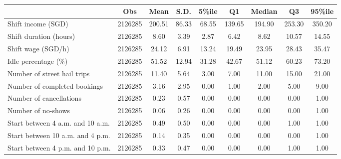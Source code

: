 {
\def\sym#1{\ifmmode^{#1}\else\(^{#1}\)\fi}
\begin{tabular}{l*{8}{S}}
\toprule
                    &         {Obs}&        {Mean}&        {S.D.}&      {5\%ile}&          {Q1}&      {Median}&          {Q3}&     {95\%ile}\\
\midrule
Shift income (SGD)  &     \num{2126285}&      200.51&       86.33&       68.55&      139.65&      194.90&      253.30&      350.20\\
Shift duration (hours)&     \num{2126285}&        8.60&        3.39&        2.87&        6.42&        8.62&       10.57&       14.55\\
Shift wage (SGD/h)  &     \num{2126285}&       24.12&        6.91&       13.24&       19.49&       23.95&       28.43&       35.47\\
Idle percentage (\%)    &     \num{2126285}&       51.52&       12.94&       31.28&       42.67&       51.12&       60.23&       73.20\\
Number of street hail trips&     \num{2126285}&       11.40&        5.64&        3.00&        7.00&       11.00&       15.00&       21.00\\
Number of completed bookings&     \num{2126285}&        3.16&        2.95&        0.00&        1.00&        2.00&        5.00&        9.00\\
Number of cancellations&     \num{2126285}&        0.23&        0.57&        0.00&        0.00&        0.00&        0.00&        1.00\\
Number of no-shows  &     \num{2126285}&        0.06&        0.26&        0.00&        0.00&        0.00&        0.00&        1.00\\
Start between 4 a.m. and 10 a.m.&     \num{2126285}&        0.49&        0.50&        0.00&        0.00&        0.00&        1.00&        1.00\\
Start between 10 a.m. and 4 p.m.&     \num{2126285}&        0.14&        0.35&        0.00&        0.00&        0.00&        0.00&        1.00\\
Start between 4 p.m. and 10 p.m.&     \num{2126285}&        0.33&        0.47&        0.00&        0.00&        0.00&        1.00&        1.00\\
\bottomrule
\end{tabular}
}

